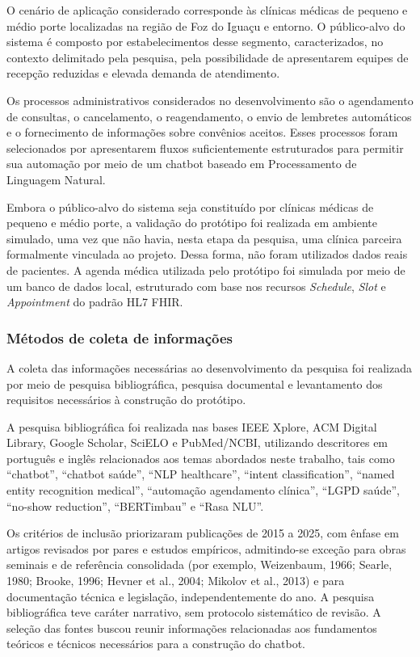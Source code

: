 \documentclass[12pt,a4paper]{extarticle}
\begin{document}
O cenário de aplicação considerado corresponde às clínicas médicas de pequeno e médio porte localizadas na região de Foz do Iguaçu e entorno. O público-alvo do sistema é composto por estabelecimentos desse segmento, caracterizados, no contexto delimitado pela pesquisa, pela possibilidade de apresentarem equipes de recepção reduzidas e elevada demanda de atendimento.

Os processos administrativos considerados no desenvolvimento são o agendamento de consultas, o cancelamento, o reagendamento, o envio de lembretes automáticos e o fornecimento de informações sobre convênios aceitos. Esses processos foram selecionados por apresentarem fluxos suficientemente estruturados para permitir sua automação por meio de um chatbot baseado em Processamento de Linguagem Natural.

Embora o público-alvo do sistema seja constituído por clínicas médicas de pequeno e médio porte, a validação do protótipo foi realizada em ambiente simulado, uma vez que não havia, nesta etapa da pesquisa, uma clínica parceira formalmente vinculada ao projeto. Dessa forma, não foram utilizados dados reais de pacientes. A agenda médica utilizada pelo protótipo foi simulada por meio de um banco de dados local, estruturado com base nos recursos \textit{Schedule}, \textit{Slot} e \textit{Appointment} do padrão HL7 FHIR.

\subsubsection{Métodos de coleta de informações}
\label{sec:coleta}

A coleta das informações necessárias ao desenvolvimento da pesquisa foi realizada por meio de pesquisa bibliográfica, pesquisa documental e levantamento dos requisitos necessários à construção do protótipo.

A pesquisa bibliográfica foi realizada nas bases IEEE Xplore, ACM Digital Library, Google Scholar, SciELO e PubMed/NCBI, utilizando descritores em português e inglês relacionados aos temas abordados neste trabalho, tais como ``chatbot'', ``chatbot saúde'', ``NLP healthcare'', ``intent classification'', ``named entity recognition medical'', ``automação agendamento clínica'', ``LGPD saúde'', ``no-show reduction'', ``BERTimbau'' e ``Rasa NLU''.

Os critérios de inclusão priorizaram publicações de 2015 a 2025, com ênfase em artigos revisados por pares e estudos empíricos, admitindo-se exceção para obras seminais e de referência consolidada (por exemplo, Weizenbaum, 1966; Searle, 1980; Brooke, 1996; Hevner et al., 2004; Mikolov et al., 2013) e para documentação técnica e legislação, independentemente do ano. A pesquisa bibliográfica teve caráter narrativo, sem protocolo sistemático de revisão. A seleção das fontes buscou reunir informações relacionadas aos fundamentos teóricos e técnicos necessários para a construção do chatbot.
\end{document}
